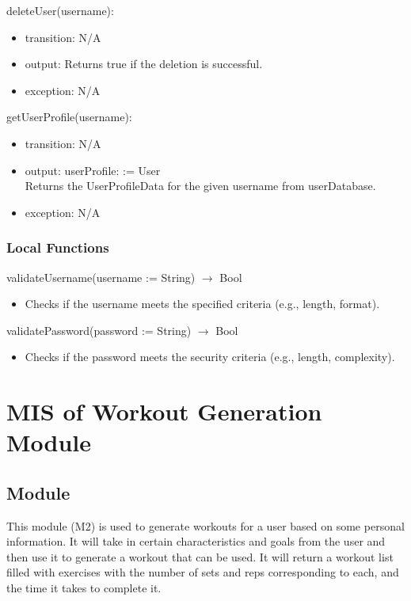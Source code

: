 \documentclass[12pt, titlepage]{article}
\begin{document}
\noindent deleteUser(username):
\begin{itemize}
\item transition: N/A
\item output: Returns true if the deletion is successful.
\item exception: N/A
\end{itemize}

\noindent getUserProfile(username):
\begin{itemize}
\item transition: N/A
\item output: userProfile: := User\\
Returns the UserProfileData for the given username from userDatabase.
\item exception: N/A
\end{itemize}


\subsubsection{Local Functions}
\noindent validateUsername(username := String) $\rightarrow$ Bool
\begin{itemize}
\item Checks if the username meets the specified criteria (e.g., length, format).
\end{itemize}

\noindent validatePassword(password := String) $\rightarrow$ Bool
\begin{itemize}
\item Checks if the password meets the security criteria (e.g., length, complexity).
\end{itemize}

\section{MIS of Workout Generation Module}

\subsection{Module}
This module (M2) is used to generate workouts for a user based on some personal information. It will take in certain characteristics and goals from the user and then use it to generate a workout that can be used. It will return a workout list filled with exercises with the number of sets and reps corresponding to each, and the time it takes to complete it. 
\end{document}
